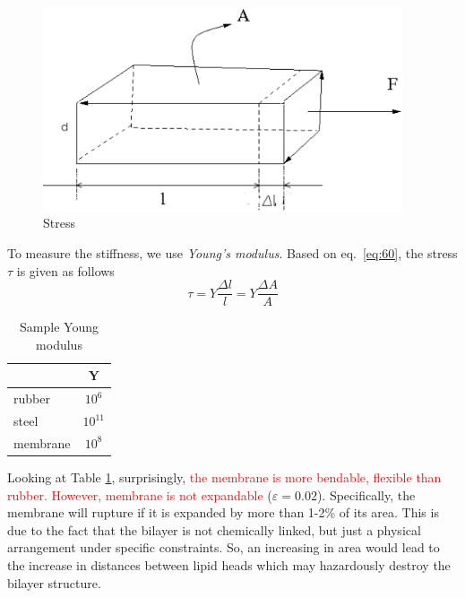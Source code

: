 \begin{figure}[htb]
  \centerline{\includegraphics[height=6cm]{./images/stress_motion.eps}}
  \caption{Stress}\label{fig:stress_motion}
\end{figure}

To measure the stiffness, we use {\it Young's modulus}. Based on
eq.~\eqref{eq:60}, the stress $\tau$ is given as follows
\begin{equation}
  \tau = Y \frac{\Delta l} {l} = Y \frac{\Delta A}{A}
\end{equation}
\begin{table}
\begin{center}
\label{tab:sample-young-modulus}
  \begin{tabular}{|l|c|}
    \hline
    & Y \\
    \hline
    rubber & $10^6$ \\
    steel & $10^{11}$ \\
    membrane & $10^8$ \\
    \hline
  \end{tabular}
\caption{Sample Young modulus}
\end{center}
\end{table}

Looking at Table \ref{tab:sample-young-modulus}, surprisingly,
\textcolor{red}{the membrane is more bendable, flexible than
  rubber. However, membrane is not expandable}
($\varepsilon=0.02$). Specifically, the membrane will rupture if it is
expanded by more than 1-2\% of its area. This is due to the fact that
the bilayer is not chemically linked, but just a physical arrangement
under specific constraints. So, an increasing in area would lead to
the increase in distances between lipid heads which may hazardously
destroy the bilayer structure.

